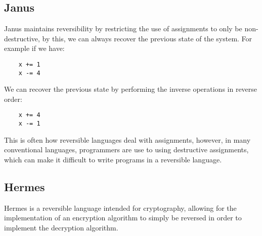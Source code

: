 \subsection*{Janus}

Janus maintains reversibility by restricting the use of assignments to only be non-destructive, by this, we can always recover the previous state of the system.
For example if we have:
\begin{lstlisting}
    x += 1
    x -= 4
\end{lstlisting}
We can recover the previous state by performing the inverse operations in reverse order:
\begin{lstlisting}
    x += 4
    x -= 1
\end{lstlisting}
This is often how reversible languages deal with assignments, however, in many conventional languages, programmers are use to using destructive assignments, which can make it difficult to write programs in a reversible language.

\begin{comment}
\subsection*{R-While}

\subsection*{ROOP}
ROOP is an expressive language which allows for rich object-oriented features and typing.
It is similar to Janus in that it restricts the use of assignments.

\subsection*{RFun}
RFun is a reversible functional programming language, it maintains reversibility by ensuring all functions encode enough information in their outputs to allow for the recovery of the inputs.
\end{comment}

\subsection*{Hermes}
Hermes is a reversible language intended for cryptography, allowing for the implementation of an encryption algorithm to simply be reversed in order to implement the decryption algorithm.

\begin{comment}
\subsection*{RSSA}
RSSA is a reversible SSA form, it is similar to both other SSA forms, but uses many of the concepts from reversible machine codes such as PISA to maintain reversibility.
One example of this is through the use of memory exchange to ensure no data is erased.
\end{comment}

